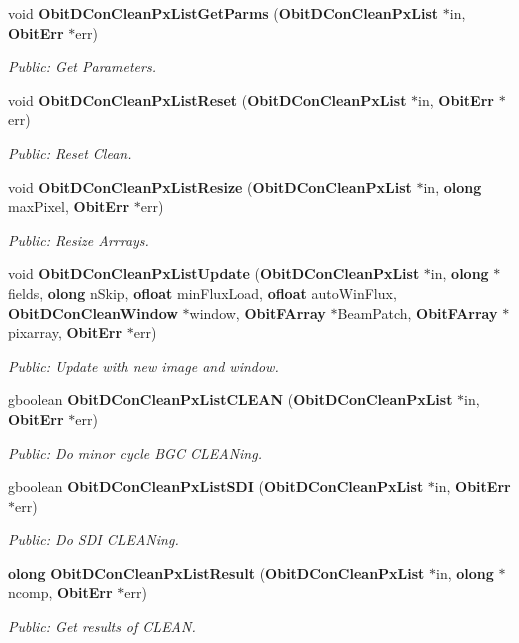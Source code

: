 \begin{CompactItemize}
void {\bf Obit\-DCon\-Clean\-Px\-List\-Get\-Parms} ({\bf Obit\-DCon\-Clean\-Px\-List} $\ast$in, {\bf Obit\-Err} $\ast$err)
\begin{CompactList}\small\item\em Public: Get Parameters. \item\end{CompactList}\item 
void {\bf Obit\-DCon\-Clean\-Px\-List\-Reset} ({\bf Obit\-DCon\-Clean\-Px\-List} $\ast$in, {\bf Obit\-Err} $\ast$err)
\begin{CompactList}\small\item\em Public: Reset Clean. \item\end{CompactList}\item 
void {\bf Obit\-DCon\-Clean\-Px\-List\-Resize} ({\bf Obit\-DCon\-Clean\-Px\-List} $\ast$in, {\bf olong} max\-Pixel, {\bf Obit\-Err} $\ast$err)
\begin{CompactList}\small\item\em Public: Resize Arrrays. \item\end{CompactList}\item 
void {\bf Obit\-DCon\-Clean\-Px\-List\-Update} ({\bf Obit\-DCon\-Clean\-Px\-List} $\ast$in, {\bf olong} $\ast$fields, {\bf olong} n\-Skip, {\bf ofloat} min\-Flux\-Load, {\bf ofloat} auto\-Win\-Flux, {\bf Obit\-DCon\-Clean\-Window} $\ast$window, {\bf Obit\-FArray} $\ast$Beam\-Patch, {\bf Obit\-FArray} $\ast$pixarray, {\bf Obit\-Err} $\ast$err)
\begin{CompactList}\small\item\em Public: Update with new image and window. \item\end{CompactList}\item 
gboolean {\bf Obit\-DCon\-Clean\-Px\-List\-CLEAN} ({\bf Obit\-DCon\-Clean\-Px\-List} $\ast$in, {\bf Obit\-Err} $\ast$err)
\begin{CompactList}\small\item\em Public: Do minor cycle BGC CLEANing. \item\end{CompactList}\item 
gboolean {\bf Obit\-DCon\-Clean\-Px\-List\-SDI} ({\bf Obit\-DCon\-Clean\-Px\-List} $\ast$in, {\bf Obit\-Err} $\ast$err)
\begin{CompactList}\small\item\em Public: Do SDI CLEANing. \item\end{CompactList}\item 
{\bf olong} {\bf Obit\-DCon\-Clean\-Px\-List\-Result} ({\bf Obit\-DCon\-Clean\-Px\-List} $\ast$in, {\bf olong} $\ast$ncomp, {\bf Obit\-Err} $\ast$err)
\begin{CompactList}\small\item\em Public: Get results of CLEAN. \item\end{CompactList}\end{CompactItemize}


